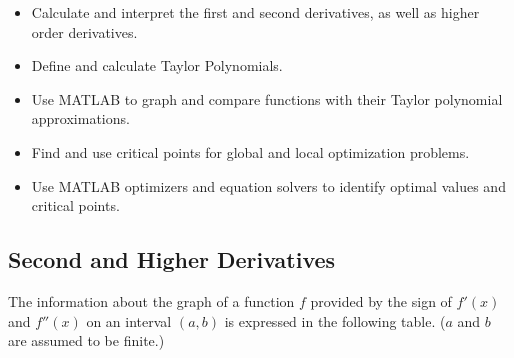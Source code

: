



\setfont
\pagestyle{fancy}
\renewcommand{\Week}{3 }
\renewcommand{\WeekTitle}{\WeekTitleThree }

\fancyhead[LE,RO]{Week \Week}  %
\fancyfoot{}
\sectionbox{Week \#\Week: \WeekTitle}


\vspace{5mm}
\goals
\begin{itemize}
\item Calculate and interpret the first and second derivatives, as
  well as higher order derivatives.
\item Define and calculate Taylor Polynomials.
\item Use MATLAB to graph and compare functions with their Taylor
  polynomial approximations.
\item Find and use critical points for global and local optimization
  problems.
\item Use MATLAB optimizers and equation solvers to identify optimal
  values and critical points.
\end{itemize}

\vspace{5mm}


\newpage
{}
\subsection*{Second and Higher Derivatives}


The information about the graph of a function $f$ provided by the sign
of $f'(x)$ and $f''(x)$ on an interval $(a,b)$ is expressed in the
following table. ($a$ and $b$ are assumed to be finite.)

